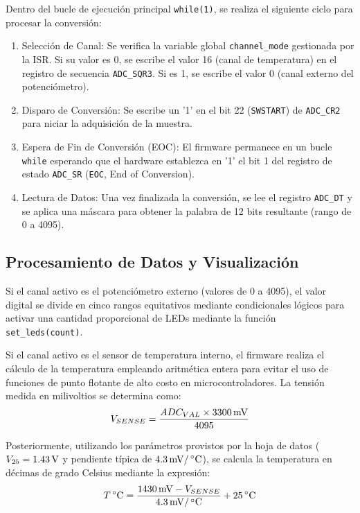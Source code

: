 Dentro del bucle de ejecución principal \texttt{while(1)}, se realiza el siguiente ciclo para procesar la conversión:
\begin{enumerate}
    \item Selección de Canal: Se verifica la variable global \texttt{channel\_mode} gestionada por la ISR.
    Si su valor es 0, se escribe el valor 16 (canal de temperatura) en el registro de secuencia \texttt{ADC\_SQR3}. Si es 1,
    se escribe el valor 0 (canal externo del potenciómetro).
    \item Disparo de Conversión: Se escribe un '1' en el bit 22 (\texttt{SWSTART}) de \texttt{ADC\_CR2} para
    niciar la adquisición de la muestra.
    \item Espera de Fin de Conversión (EOC): El firmware permanece en un bucle \texttt{while} esperando que el
    hardware establezca en '1' el bit 1 del registro de estado \texttt{ADC\_SR} (\texttt{EOC}, End of Conversion).
    \item Lectura de Datos: Una vez finalizada la conversión, se lee el registro \texttt{ADC\_DT} y se aplica
    una máscara para obtener la palabra de 12 bits resultante (rango de 0 a 4095).
\end{enumerate}

\subsection{Procesamiento de Datos y Visualización}

Si el canal activo es el potenciómetro externo (valores de 0 a 4095), el valor digital se divide en cinco rangos
equitativos mediante condicionales lógicos para activar una cantidad proporcional de LEDs mediante la función
\texttt{set\_leds(count)}.

Si el canal activo es el sensor de temperatura interno, el firmware realiza el cálculo de la temperatura empleando
aritmética entera para evitar el uso de funciones de punto flotante de alto costo en microcontroladores. 
La tensión medida en milivoltios se determina como:
\begin{equation}
    V_{SENSE} = \frac{ADC_{VAL} \times 3300\,\mathrm{mV}}{4095}
    \label{eq.ej2:vsense}
\end{equation}

Posteriormente, utilizando los parámetros provistos por la hoja de datos ($V_{25} = 1.43\,\mathrm{V}$ y pendiente típica de
$4.3\,\mathrm{mV}/\,^\circ\mathrm{C}$), se calcula la temperatura en décimas de grado Celsius mediante la expresión:
\begin{equation}
    T\,^\circ\mathrm{C} = \frac{1430\,\mathrm{mV} - V_{SENSE}}{4.3\,\mathrm{mV}/\,^\circ\mathrm{C}} + 25\,^\circ\mathrm{C}
    \label{eq.ej2:temp}
\end{equation}

